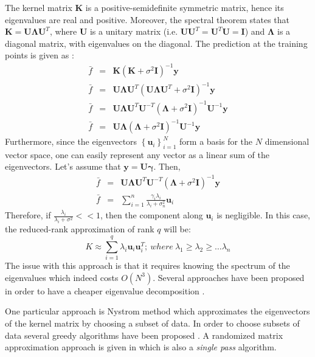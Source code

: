 \documentclass{article}
\begin{document}
The kernel matrix $\mathbf{K}$ is a positive-semidefinite symmetric matrix, hence its eigenvalues are real and positive. Moreover, the spectral theorem states that $\mathbf{K}=\mathbf{U\Lambda U}^T$, where $\mathbf{U}$ is a unitary matrix (i.e. $\mathbf{U}\mathbf{U}^T=\mathbf{U}^T\mathbf{U}=\mathbf{I}$) and $\mathbf{\Lambda}$ is a diagonal matrix, with eigenvalues on the diagonal. The prediction at the training points is given as :
\begin{eqnarray}
\bar{f}&=&\mathbf{K}(\mathbf{K}+\sigma^2\mathbf{I})^{-1}\mathbf{y} \nonumber \\
\bar{f}&=&\mathbf{U\Lambda U}^T(\mathbf{U\Lambda U}^T+\sigma^2\mathbf{I})^{-1}\mathbf{y} \nonumber \\
\bar{f}&=& \mathbf{U\Lambda U}^T\mathbf{U}^{-T}(\mathbf{\Lambda}+\sigma^2\mathbf{I})^{-1}\mathbf{U}^{-1}\mathbf{y} \nonumber \\
\bar{f}&=& \mathbf{U\Lambda}(\mathbf{\Lambda}+\sigma^2\mathbf{I})^{-1}\mathbf{U}^{-1}\mathbf{y} 
\end{eqnarray}
Furthermore, since the eigenvectors $\left\{\mathbf{u}_i\right\}_{i=1}^N$ form a basis for the $N$ dimensional vector space, one can easily represent any vector as a linear sum of the eigenvectors. Let's assume that $\mathbf{y}=\mathbf{U}\mathbf{\gamma}$. Then,
\begin{eqnarray}
\bar{f}&=& \mathbf{U\Lambda U}^T\mathbf{U}^{-T}(\mathbf{\Lambda}+\sigma^2\mathbf{I})^{-1}\mathbf{y}  \nonumber \\
\bar{f}&=&\sum_{i=1}^n\frac{\gamma_i\lambda_i}{\lambda_i+\sigma_n^2}\mathbf{u}_i
\end{eqnarray}
Therefore, if $\frac{\lambda_i}{\lambda_i+\sigma^2}<<1$, then the component along $\mathbf{u}_i$ is negligible. In this case, the reduced-rank approximation of rank $q$ will be:
\begin{equation}
K\approx \sum_{i=1}^q \lambda_i \mathbf{u}_i \mathbf{u}_i^T; \> where \> \lambda_1\geq \lambda_2 \geq \dots \lambda_n
\end{equation}
The issue with this approach is that it requires knowing the spectrum of the eigenvalues which indeed costs $O(N^3)$.  Several approaches have been proposed in order to have a cheaper eigenvalue decomposition \cite{rasmussen06}. 

One particular approach is Nystrom method which approximates the eigenvectors of the kernel matrix by choosing a subset of data. In order to choose subsets of data several greedy algorithms have been proposed \cite{rasmussen} \cite{smolaGreedy}. A randomized matrix approximation approach is given in \cite{RandomizedMatrixDecompose} which is also a \textit{single pass} algorithm.
\end{document}
